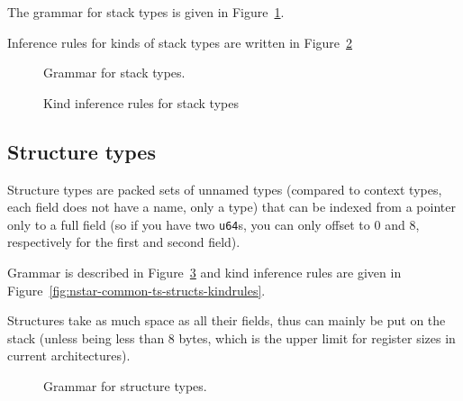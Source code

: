 The grammar for stack types is given in Figure~\ref{fig:nstar-common-ts-stack-types-syntax}.

Inference rules for kinds of stack types are written in Figure~\ref{fig:nstar-common-ts-stack-types-kindrules}

\begin{figure}[htb]
  \centering
  \caption{Grammar for stack types.}
  \label{fig:nstar-common-ts-stack-types-syntax}
\end{figure}

\begin{figure}[H]
  \centering


  \caption{Kind inference rules for stack types}
  \label{fig:nstar-common-ts-stack-types-kindrules}
\end{figure}

\subsection{Structure types}\label{subsec:nstar-common-ts-structs}

Structure types are packed sets of unnamed types (compared to context types, each field does not have a name, only a type) that can be indexed from a pointer only to a full field (so if you have two \texttt{u64}s, you can only offset to $0$ and $8$, respectively for the first and second field).

Grammar is described in Figure~\ref{fig:nstar-common-ts-structs-syntax} and kind inference rules are given in Figure~\ref{fig:nstar-common-ts-structs-kindrules}.

Structures take as much space as all their fields, thus can mainly be put on the stack (unless being less than 8 bytes, which is the upper limit for register sizes in current architectures).

\begin{figure}[htb]
  \centering


  \caption{Grammar for structure types.}
  \label{fig:nstar-common-ts-structs-syntax}
\end{figure}


